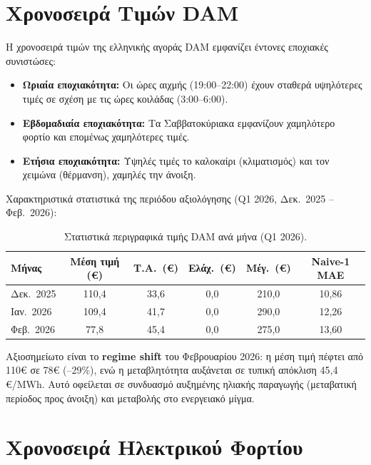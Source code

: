 \section{Χρονοσειρά Τιμών DAM}
\label{sec:price_timeseries}

Η χρονοσειρά τιμών της ελληνικής αγοράς DAM εμφανίζει έντονες εποχιακές συνιστώσες:
\begin{itemize}
    \item \textbf{Ωριαία εποχιακότητα:} Οι ώρες αιχμής (19:00--22:00) έχουν σταθερά υψηλότερες
    τιμές σε σχέση με τις ώρες κοιλάδας (3:00--6:00).
    \item \textbf{Εβδομαδιαία εποχιακότητα:} Τα Σαββατοκύριακα εμφανίζουν χαμηλότερο φορτίο και
    επομένως χαμηλότερες τιμές.
    \item \textbf{Ετήσια εποχιακότητα:} Υψηλές τιμές το καλοκαίρι (κλιματισμός) και τον χειμώνα
    (θέρμανση), χαμηλές την άνοιξη.
\end{itemize}

Χαρακτηριστικά στατιστικά της περιόδου αξιολόγησης (Q1 2026, Δεκ.\ 2025 -- Φεβ.\ 2026):

\begin{table}[H]
\centering
\caption{Στατιστικά περιγραφικά τιμής DAM ανά μήνα (Q1 2026).}
\label{tab:price_stats}
\begin{tabular}{lccccc}
\toprule
\textbf{Μήνας} & \textbf{Μέση τιμή (€)} & \textbf{Τ.Α.\ (€)} & \textbf{Ελάχ.\ (€)} & \textbf{Μέγ.\ (€)} & \textbf{Naive-1 MAE} \\
\midrule
Δεκ.\ 2025 & 110,4 & 33,6 & 0,0 & 210,0 & 10,86 \\
Ιαν.\ 2026 & 109,4 & 41,7 & 0,0 & 290,0 & 12,26 \\
Φεβ.\ 2026 & 77,8  & 45,4 & 0,0 & 275,0 & 13,60 \\
\bottomrule
\end{tabular}
\end{table}

Αξιοσημείωτο είναι το \textbf{regime shift} του Φεβρουαρίου 2026: η μέση τιμή πέφτει από 110€ σε
78€ (--29\%), ενώ η μεταβλητότητα αυξάνεται σε τυπική απόκλιση 45,4 €/MWh. Αυτό οφείλεται σε
συνδυασμό αυξημένης ηλιακής παραγωγής (μεταβατική περίοδος προς άνοιξη) και μεταβολής στο
ενεργειακό μίγμα.


\section{Χρονοσειρά Ηλεκτρικού Φορτίου}
\label{sec:load_timeseries}

